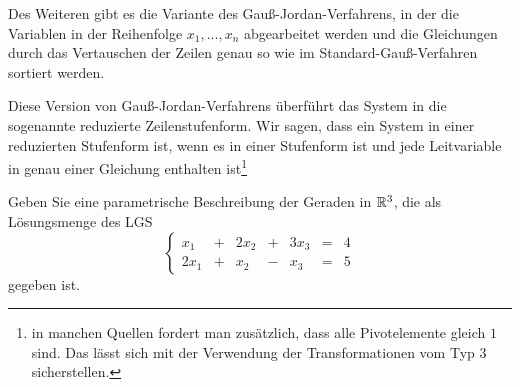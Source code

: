 Des Weiteren gibt es die Variante des Gauß-Jordan-Verfahrens, in der die Variablen in der Reihenfolge $x_1,\ldots,x_n$ abgearbeitet werden und die Gleichungen durch das Vertauschen der Zeilen genau so wie im Standard-Gauß-Verfahren sortiert werden. 

Diese Version von Gauß-Jordan-Verfahrens  überführt das System in die sogenannte reduzierte Zeilenstufenform. Wir sagen, dass ein System in einer reduzierten Stufenform ist, wenn es in einer Stufenform ist und jede Leitvariable in genau einer Gleichung enthalten ist\footnote{in manchen Quellen fordert man zusätzlich, dass alle Pivotelemente gleich $1$ sind. Das lässt sich mit der Verwendung der Transformationen vom Typ 3 sicherstellen.}

\begin{bsp}
	Geben Sie eine parametrische Beschreibung der Geraden in $\mathbb R^3$, die als Lösungsmenge des LGS
	\[
	\left\{
\begin{array}{ccccccc}
	x_1 &  +&  2 x_2 & + & 3 x_3 &  = & 4
	\\		 2 x_1 & + & x_2 & -&  x_3 & =&  5
\end{array}\right. 
	\]
	gegeben ist. 
\end{bsp} 

